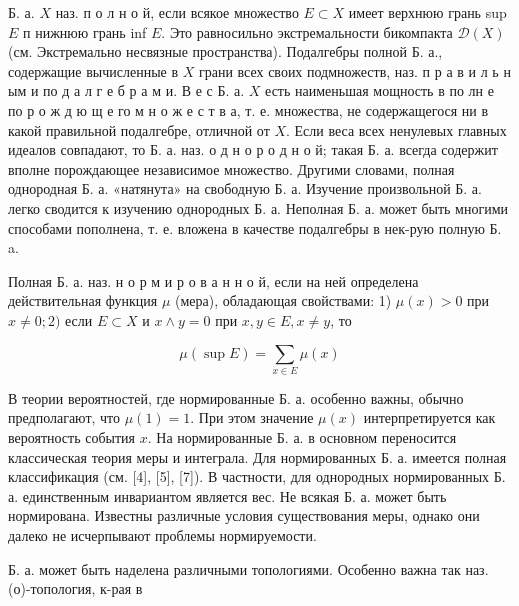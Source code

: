 \documentclass[10pt]{article}
\begin{document}
Б. а. $X$ наз. п о л н о й, если всякое множество $E \subset X$ имеет верхнюю грань sup $E$ п нижнюю грань inf $E$. Это равносильно экстремальности бикомпакта $\mathcal{D}(X)$ (см. Экстремально несвязные пространства). Подалгебры полной Б. а., содержащие вычисленные в $X$ грани всех своих подмножеств, наз. п р а в и л ь н ым и по д а л г е б р а м и. В е с Б. а. $X$ есть наименьшая мощность в по лн е по р о ж д ю щ е го м н о ж е с т в а, т. е. множества, не содержащегося ни в какой правильной подалгебре, отличной от $X$. Если веса всех ненулевых главных идеалов совпадают, то Б. а. наз. о д н о р о д н о й; такая Б. а. всегда содержит вполне порождающее независимое множество. Другими словами, полная однородная Б. а. «натянута» на свободную Б. а. Изучение произвольной Б. а. легко сводится к изучению однородных Б. а. Неполная Б. а. может быть многими способами пополнена, т. е. вложена в качестве подалгебры в нек-рую полную Б. a.



Полная Б. а. наз. н о р м и р о в а н н о й, если на ней определена действительная функция $\mu$ (мера), обладающая свойствами: 1) $\mu(x)>0$ при $x \neq 0 ; 2)$ если $E \subset X$ и $x \wedge y=0$ при $x, y \in E, x \neq y$, то



\[

\mu(\sup E)=\sum_{x \in E} \mu(x)

\]



В теории вероятностей, где нормированные Б. а. особенно важны, обычно предполагают, что $\mu(1)=1$. При этом значение $\mu(x)$ интерпретируется как вероятность события $x$. На нормированные Б. а. в основном переносится классическая теория меры и интеграла. Для нормированных Б. а. имеется полная классификация (см. [4], [5], [7]). В частности, для однородных нормированных Б. а. единственным инвариантом является вес. Не всякая Б. а. может быть нормирована. Известны различные условия существования меры, однако они далеко не исчерпывают проблемы нормируемости.



Б. а. может быть наделена различными топологиями. Особенно важна так наз. (о)-топология, к-рая в
\end{document}
